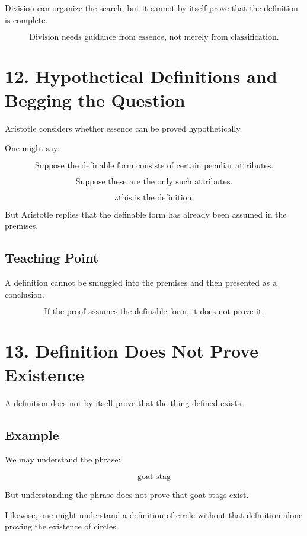 \documentclass[12pt]{article}
\begin{document}
Division can organize the search, but it cannot by itself prove that the
definition is complete.

\[
\boxed{
\text{Division needs guidance from essence, not merely from classification.}
}
\]

\section*{12. Hypothetical Definitions and Begging the Question}

Aristotle considers whether essence can be proved hypothetically.

One might say:

\[
\text{Suppose the definable form consists of certain peculiar attributes.}
\]

\[
\text{Suppose these are the only such attributes.}
\]

\[
\therefore \text{this is the definition.}
\]

But Aristotle replies that the definable form has already been assumed in the
premises.

\subsection*{Teaching Point}

A definition cannot be smuggled into the premises and then presented as a
conclusion.

\[
\boxed{
\text{If the proof assumes the definable form, it does not prove it.}
}
\]

\section*{13. Definition Does Not Prove Existence}

A definition does not by itself prove that the thing defined exists.

\subsection*{Example}

We may understand the phrase:

\[
\text{goat-stag}
\]

But understanding the phrase does not prove that goat-stags exist.

Likewise, one might understand a definition of circle without that definition
alone proving the existence of circles.
\end{document}
